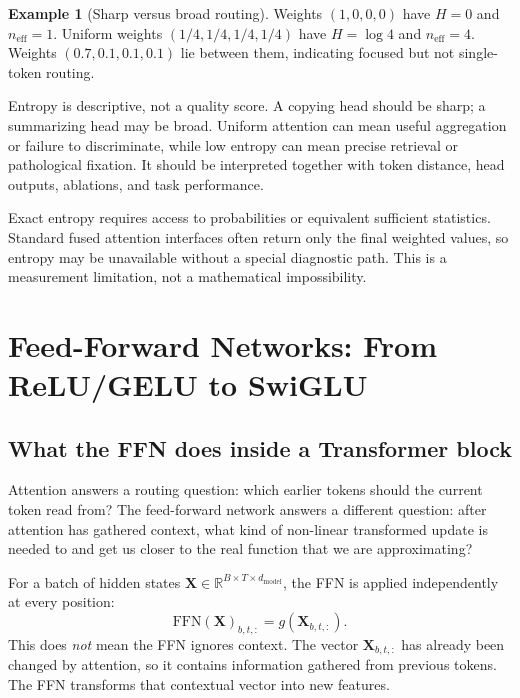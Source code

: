 \documentclass[11pt,a4paper]{article}
\theoremstyle{definition}
\newtheorem{example}{Example}[section]
\theoremstyle{plain}
\newcommand{\mX}{\bm{X}}
\newcommand{\reals}{\mathbb{R}}
\newcommand{\dmodel}{d_{\mathrm{model}}}
\begin{document}
\begin{example}[Sharp versus broad routing]
Weights $(1,0,0,0)$ have $H=0$ and $n_{\mathrm{eff}}=1$. Uniform weights $(1/4,1/4,1/4,1/4)$ have $H=\log4$ and $n_{\mathrm{eff}}=4$. Weights $(0.7,0.1,0.1,0.1)$ lie between them, indicating focused but not single-token routing.
\end{example}

Entropy is descriptive, not a quality score. A copying head should be sharp; a summarizing head may be broad. Uniform attention can mean useful aggregation or failure to discriminate, while low entropy can mean precise retrieval or pathological fixation. It should be interpreted together with token distance, head outputs, ablations, and task performance.

Exact entropy requires access to probabilities or equivalent sufficient statistics. Standard fused attention interfaces often return only the final weighted values, so entropy may be unavailable without a special diagnostic path. This is a measurement limitation, not a mathematical impossibility.


\section{Feed-Forward Networks: From ReLU/GELU to SwiGLU}
\label{sec:ffn}

\subsection{What the FFN does inside a Transformer block}

Attention answers a routing question: which earlier tokens should the current token read from? The feed-forward network answers a different question: after attention has gathered context, what kind of non-linear transformed update is needed to and get us closer to the real function that we are approximating?

For a batch of hidden states $\mX\in\reals^{B\times T\times \dmodel}$, the FFN is applied independently at every position:
\begin{equation}
    \mathrm{FFN}(\mX)_{b,t,:}=g(\mX_{b,t,:}).
\end{equation}
This does \emph{not} mean the FFN ignores context. The vector $\mX_{b,t,:}$ has already been changed by attention, so it contains information gathered from previous tokens. The FFN transforms that contextual vector into new features.
\end{document}
